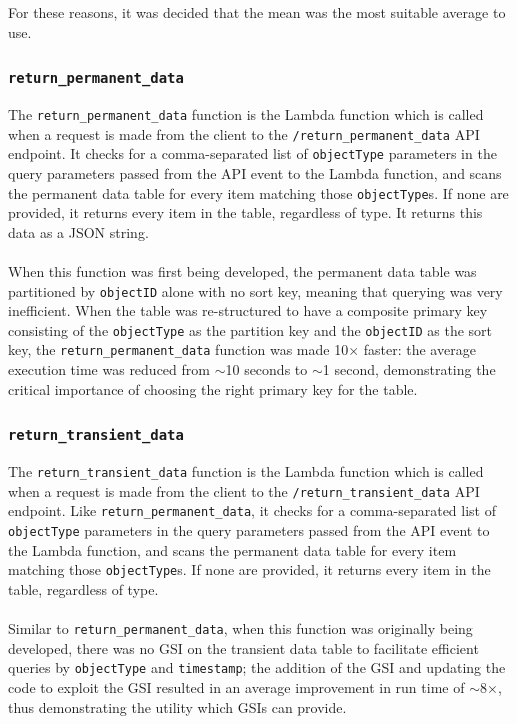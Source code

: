 \documentclass[a4paper,11pt]{report}
\begin{document}
For these reasons, it was decided that the mean was the most suitable average to use.

\subsubsection{\texttt{return_permanent_data}}
The \verb|return_permanent_data| function is the Lambda function which is called when a request is made from the client to the \verb|/return_permanent_data| API endpoint.
It checks for a comma-separated list of \verb|objectType| parameters in the query parameters passed from the API event to the Lambda function, and scans the permanent data table for every item matching those \verb|objectType|s.
If none are provided, it returns every item in the table, regardless of type.
It returns this data as a JSON string.
\\\\
When this function was first being developed, the permanent data table was partitioned by \verb|objectID| alone with no sort key, meaning that querying was very inefficient.
When the table was re-structured to have a composite primary key consisting of the \verb|objectType| as the partition key and the \verb|objectID| as the sort key, the \verb|return_permanent_data| function was made 10$\times$ faster:
the average execution time was reduced from $\sim$10 seconds to $\sim$1 second, demonstrating the critical importance of choosing the right primary key for the table.

\subsubsection{\texttt{return_transient_data}}
The \verb|return_transient_data| function is the Lambda function which is called when a request is made from the client to the \verb|/return_transient_data| API endpoint.
Like \verb|return_permanent_data|, it checks for a comma-separated list of \verb|objectType| parameters in the query parameters passed from the API event to the Lambda function, and scans the permanent data table for every item matching those \verb|objectType|s.
If none are provided, it returns every item in the table, regardless of type.
\\\\
Similar to \verb|return_permanent_data|, when this function was originally being developed, there was no GSI on the transient data table to facilitate efficient queries by \verb|objectType| and \verb|timestamp|;
the addition of the GSI and updating the code to exploit the GSI resulted in an average improvement in run time of $\sim$8$\times$, thus demonstrating the utility which GSIs can provide.
\end{document}
